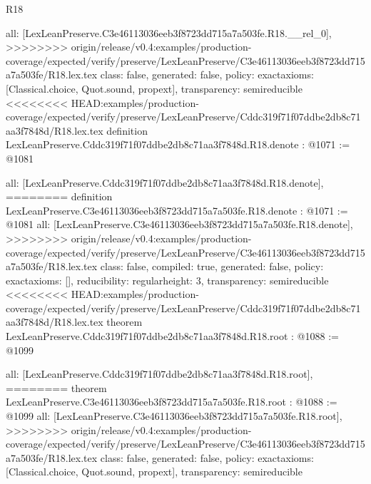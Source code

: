 \begin{lexlean}{R18}
\begin{coremodule}
{{{{{{{{{{{{  all: [LexLeanPreserve.C3e46113036eeb3f8723dd715a7a503fe.R18.__rel_0],
>>>>>>>> origin/release/v0.4:examples/production-coverage/expected/verify/preserve/LexLeanPreserve/C3e46113036eeb3f8723dd715a7a503fe/R18.lex.tex
  class: false,
  generated: false,
  policy: exact{axioms: [Classical.choice, Quot.sound, propext]},
  transparency: semireducible
}
<<<<<<<< HEAD:examples/production-coverage/expected/verify/preserve/LexLeanPreserve/Cddc319f71f07ddbe2db8c71aa3f7848d/R18.lex.tex
definition LexLeanPreserve.Cddc319f71f07ddbe2db8c71aa3f7848d.R18.denote : @1071 := @1081 {
  all: [LexLeanPreserve.Cddc319f71f07ddbe2db8c71aa3f7848d.R18.denote],
========
definition LexLeanPreserve.C3e46113036eeb3f8723dd715a7a503fe.R18.denote : @1071 := @1081 {
  all: [LexLeanPreserve.C3e46113036eeb3f8723dd715a7a503fe.R18.denote],
>>>>>>>> origin/release/v0.4:examples/production-coverage/expected/verify/preserve/LexLeanPreserve/C3e46113036eeb3f8723dd715a7a503fe/R18.lex.tex
  class: false,
  compiled: true,
  generated: false,
  policy: exact{axioms: []},
  reducibility: regular{height: 3},
  transparency: semireducible
}
<<<<<<<< HEAD:examples/production-coverage/expected/verify/preserve/LexLeanPreserve/Cddc319f71f07ddbe2db8c71aa3f7848d/R18.lex.tex
theorem LexLeanPreserve.Cddc319f71f07ddbe2db8c71aa3f7848d.R18.root : @1088 := @1099 {
  all: [LexLeanPreserve.Cddc319f71f07ddbe2db8c71aa3f7848d.R18.root],
========
theorem LexLeanPreserve.C3e46113036eeb3f8723dd715a7a503fe.R18.root : @1088 := @1099 {
  all: [LexLeanPreserve.C3e46113036eeb3f8723dd715a7a503fe.R18.root],
>>>>>>>> origin/release/v0.4:examples/production-coverage/expected/verify/preserve/LexLeanPreserve/C3e46113036eeb3f8723dd715a7a503fe/R18.lex.tex
  class: false,
  generated: false,
  policy: exact{axioms: [Classical.choice, Quot.sound, propext]},
  transparency: semireducible
}

}}}}}}}}}}}}}
\end{coremodule}
\end{lexlean}
